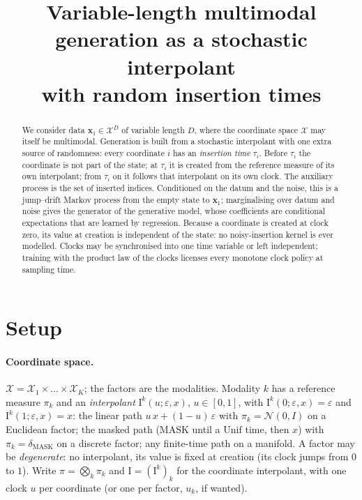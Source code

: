 \documentclass[11pt]{article}
\title{Variable-length multimodal generation as a stochastic interpolant\\ with random insertion times}
\author{}
\date{}
\newcommand{\X}{\mathcal{X}}
\newcommand{\bx}{\bm{x}}
\newcommand{\Iu}{\mathrm{I}}
\begin{document}
\maketitle

\begin{abstract}
We consider data $\bx_1\in\X^{D}$ of variable length $D$, where the coordinate space $\X$ may itself be multimodal. Generation is built from a stochastic interpolant with one extra source of randomness: every coordinate $i$ has an \emph{insertion time} $\tau_i$. Before $\tau_i$ the coordinate is not part of the state; at $\tau_i$ it is created from the reference measure of its own interpolant; from $\tau_i$ on it follows that interpolant on its own clock. The auxiliary process is the set of inserted indices. Conditioned on the datum and the noise, this is a jump--drift Markov process from the empty state to $\bx_1$; marginalising over datum and noise gives the generator of the generative model, whose coefficients are conditional expectations that are learned by regression. Because a coordinate is created at clock zero, its value at creation is independent of the state: no noisy-insertion kernel is ever modelled. Clocks may be synchronised into one time variable or left independent; training with the product law of the clocks licenses every monotone clock policy at sampling time.
\end{abstract}

\section{Setup}

\paragraph{Coordinate space.}
$\X=\X_1\times\dots\times\X_K$; the factors are the modalities. Modality $k$ has a reference measure $\pi_k$ and an \emph{interpolant} $\Iu^{k}(u;\varepsilon,x)$, $u\in[0,1]$, with $\Iu^k(0;\varepsilon,x)=\varepsilon$ and $\Iu^k(1;\varepsilon,x)=x$: the linear path $u\,x+(1-u)\,\varepsilon$ with $\pi_k=\mathcal N(0,I)$ on a Euclidean factor; the masked path ($\mathrm{MASK}$ until a $\mathrm{Unif}$ time, then $x$) with $\pi_k=\delta_{\mathrm{MASK}}$ on a discrete factor; any finite-time path on a manifold. A factor may be \emph{degenerate}: no interpolant, its value is fixed at creation (its clock jumps from $0$ to $1$). Write $\pi=\bigotimes_k\pi_k$ and $\Iu=(\Iu^k)_k$ for the coordinate interpolant, with one clock $u$ per coordinate (or one per factor, $u_{k}$, if wanted).
\end{document}
